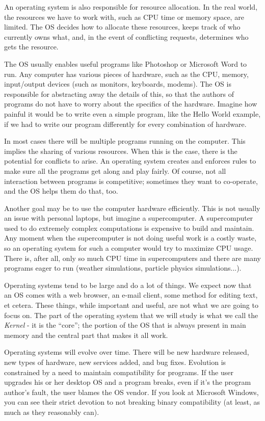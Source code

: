 An operating system is also responsible for resource allocation. In the real world, the resources we have to work with, such as CPU time or memory space, are limited. The OS decides how to allocate these resources, keeps track of who currently owns what, and, in the event of conflicting requests, determines who gets the resource.

The OS usually enables useful programs like Photoshop or Microsoft Word to run. Any computer has various pieces of hardware, such as the CPU, memory, input/output devices (such as monitors, keyboards, modems). The OS is responsible for abstracting away the details of this, so that the authors of programs do not have to worry about the specifics of the hardware. Imagine how painful it would be to write even a simple program, like the Hello World example, if we had to write our program differently for every combination of hardware.

In most cases there will be multiple programs running on the computer. This implies the sharing of various resources. When this is the case, there is the potential for conflicts to arise. An operating system creates and enforces rules to make sure all the programs get along and play fairly. Of course, not all interaction between programs is competitive; sometimes they want to co-operate, and the OS helps them do that, too.

Another goal may be to use the computer hardware efficiently. This is not usually an issue with personal laptops, but imagine a supercomputer. A supercomputer used to do extremely complex computations is expensive to build and maintain. Any moment when the supercomputer is not doing useful work is a costly waste, so an operating system for such a computer would try to maximize CPU usage. There is, after all, only so much CPU time in supercomputers and there are many programs eager to run (weather simulations, particle physics simulations...).

Operating systems tend to be large and do a lot of things. We expect now that an OS comes with a web browser, an e-mail client, some method for editing text, et cetera. These things, while important and useful, are not what we are going to focus on. The part of the operating system that we will study is what we call the \textit{Kernel} - it is the ``core''; the portion of the OS that is always present in main memory and the central part that makes it all work.

Operating systems will evolve over time. There will be new hardware released, new types of hardware, new services added, and bug fixes. Evolution is constrained by a need to maintain compatibility for programs. If the user upgrades his or her desktop OS and a program breaks, even if it's the program author's fault, the user blames the OS vendor. If you look at Microsoft Windows, you can see their strict devotion to not breaking binary compatibility (at least, as much as they reasonably can).

